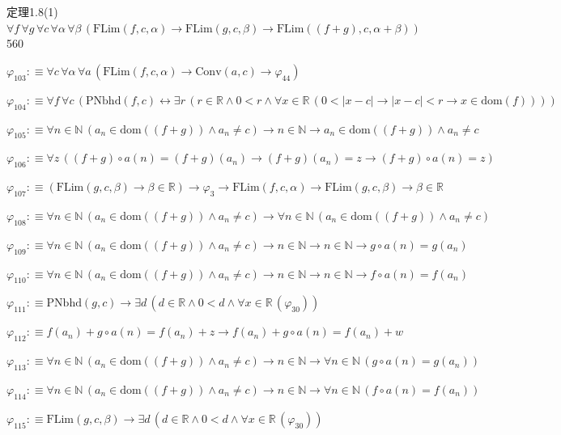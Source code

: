 \begin{fullproof}{定理1.8(1)}{$\forall f\,\forall g\,\forall c\,\forall \alpha\,\forall \beta\,(\mathrm{FLim}(f,c,\alpha) \to \mathrm{FLim}(g,c,\beta) \to \mathrm{FLim}((f + g),c,\alpha + \beta))$}{560}
\begin{abbrevlist}
\item $\varphi_{103} :\equiv \forall c\,\forall \alpha\,\forall a\,(\mathrm{FLim}(f,c,\alpha) \to \mathrm{Conv}(a,c) \to \varphi_{44})$
\item $\varphi_{104} :\equiv \forall f\,\forall c\,(\mathrm{PNbhd}(f,c) \leftrightarrow \exists r\,(r \in \mathbb{R} \land 0 < r \land \forall x \in \mathbb{R}\,(0 < \lvert x - c \rvert \to \lvert x - c \rvert < r \to x \in \mathrm{dom}(f))))$
\item $\varphi_{105} :\equiv \forall n \in \mathbb{N}\,(a_{n} \in \mathrm{dom}((f + g)) \land a_{n} \neq c) \to n \in \mathbb{N} \to a_{n} \in \mathrm{dom}((f + g)) \land a_{n} \neq c$
\item $\varphi_{106} :\equiv \forall z\,((f + g) \circ a(n) = (f + g)(a_{n}) \to (f + g)(a_{n}) = z \to (f + g) \circ a(n) = z)$
\item $\varphi_{107} :\equiv (\mathrm{FLim}(g,c,\beta) \to \beta \in \mathbb{R}) \to \varphi_{3} \to \mathrm{FLim}(f,c,\alpha) \to \mathrm{FLim}(g,c,\beta) \to \beta \in \mathbb{R}$
\item $\varphi_{108} :\equiv \forall n \in \mathbb{N}\,(a_{n} \in \mathrm{dom}((f + g)) \land a_{n} \neq c) \to \forall n \in \mathbb{N}\,(a_{n} \in \mathrm{dom}((f + g)) \land a_{n} \neq c)$
\item $\varphi_{109} :\equiv \forall n \in \mathbb{N}\,(a_{n} \in \mathrm{dom}((f + g)) \land a_{n} \neq c) \to n \in \mathbb{N} \to n \in \mathbb{N} \to g \circ a(n) = g(a_{n})$
\item $\varphi_{110} :\equiv \forall n \in \mathbb{N}\,(a_{n} \in \mathrm{dom}((f + g)) \land a_{n} \neq c) \to n \in \mathbb{N} \to n \in \mathbb{N} \to f \circ a(n) = f(a_{n})$
\item $\varphi_{111} :\equiv \mathrm{PNbhd}(g,c) \to \exists d\,(d \in \mathbb{R} \land 0 < d \land \forall x \in \mathbb{R}\,(\varphi_{30}))$
\item $\varphi_{112} :\equiv f(a_{n}) + g \circ a(n) = f(a_{n}) + z \to f(a_{n}) + g \circ a(n) = f(a_{n}) + w$
\item $\varphi_{113} :\equiv \forall n \in \mathbb{N}\,(a_{n} \in \mathrm{dom}((f + g)) \land a_{n} \neq c) \to n \in \mathbb{N} \to \forall n \in \mathbb{N}\,(g \circ a(n) = g(a_{n}))$
\item $\varphi_{114} :\equiv \forall n \in \mathbb{N}\,(a_{n} \in \mathrm{dom}((f + g)) \land a_{n} \neq c) \to n \in \mathbb{N} \to \forall n \in \mathbb{N}\,(f \circ a(n) = f(a_{n}))$
\item $\varphi_{115} :\equiv \mathrm{FLim}(g,c,\beta) \to \exists d\,(d \in \mathbb{R} \land 0 < d \land \forall x \in \mathbb{R}\,(\varphi_{30}))$

\end{abbrevlist}
\end{fullproof}
